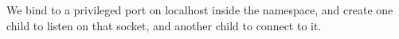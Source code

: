 \documentclass{acmart}
\begin{document}
We bind to a privileged port on localhost inside the namespace,
and create one child to listen on that socket,
and another child to connect to it.
\end{document}
